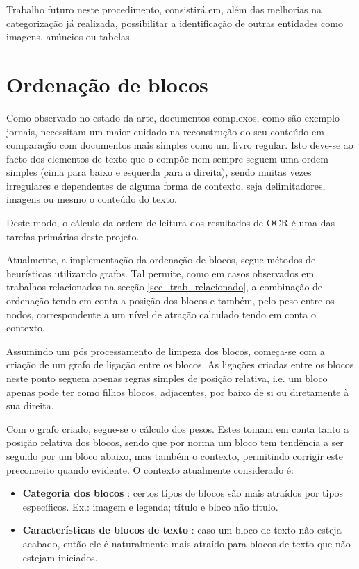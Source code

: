 Trabalho futuro neste procedimento, consistirá em, além das melhorias na categorização já realizada, possibilitar a identificação de outras entidades como imagens, anúncios ou tabelas.






\section{Ordenação de blocos}
\label{ordenacao_blocos}

Como observado no estado da arte, documentos complexos, como são exemplo jornais, necessitam um maior cuidado na reconstrução do seu conteúdo em comparação com documentos mais simples como um livro regular. Isto deve-se ao facto dos elementos de texto que o compõe nem sempre seguem uma ordem simples (cima para baixo e esquerda para a direita), sendo muitas vezes irregulares e dependentes de alguma forma de contexto, seja delimitadores, imagens ou mesmo o conteúdo do texto.

Deste modo, o cálculo da ordem de leitura dos resultados de OCR é uma das tarefas primárias deste projeto.

Atualmente, a implementação da ordenação de blocos, segue métodos de heurísticas utilizando grafos. Tal permite, como em casos observados em trabalhos relacionados na secção  \ref{sec_trab_relacionado}, a combinação de ordenação tendo em conta a posição dos blocos e também, pelo peso entre os nodos, correspondente a um nível de atração calculado tendo em conta o contexto.

Assumindo um pós processamento de limpeza dos blocos, começa-se com a criação de um grafo de ligação entre os blocos. As ligações criadas entre os blocos neste ponto seguem apenas regras simples de posição relativa, i.e. um bloco apenas pode ter como filhos blocos, adjacentes, por baixo de si ou diretamente à sua direita.

Com o grafo criado, segue-se o cálculo dos pesos. Estes tomam em conta tanto a posição relativa dos blocos, sendo que por norma um bloco tem tendência a ser seguido por um bloco abaixo, mas também o contexto, permitindo corrigir este preconceito quando evidente. O contexto atualmente considerado é:
\begin{itemize}
    \item \textbf{Categoria dos blocos} : certos tipos de blocos são mais atraídos por tipos específicos. Ex.: imagem e legenda; título e bloco não título.
    \item \textbf{Características de blocos de texto} : caso um bloco de texto não esteja acabado, então ele é naturalmente mais atraído para blocos de texto que não estejam iniciados.
\end{itemize}

